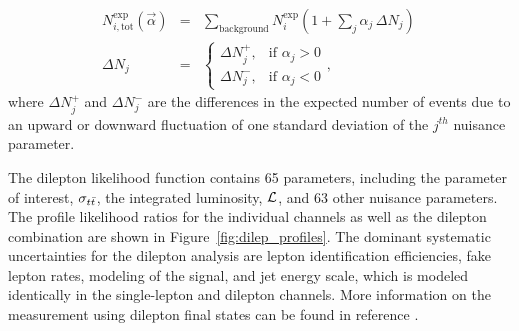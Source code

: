 \begin{eqnarray}\label{Eq:alphaInterpolation}
N^{\text{exp}}_{i, \text{tot}}(\vec{\alpha}) &=& \sum_{\text{background}} N^{\text{exp}}_{i} (1 + \sum_{j} \alpha_{j} \, \Delta N_j  ) \, \\ 
\Delta N_j &=& \begin{cases} \Delta N^{+}_{j}, & \mbox{if } \alpha_{j} > 0  \\ \Delta N^{-}_{j}, & \mbox{if } \alpha_{j} < 0 \end{cases} , 
\end{eqnarray} 
where $\Delta N^{+}_{j}$ and $\Delta N^{-}_{j}$ are the differences in the expected number of events due to an upward or downward fluctuation of one standard deviation of the $j^{th}$ nuisance parameter. 

The dilepton likelihood function contains 65 parameters, including the parameter of interest, $\sigma_{t\bar{t}}$, the integrated luminosity, ${\cal L}$, and 63 other nuisance parameters.
The profile likelihood ratios for the individual channels as well as the dilepton combination are shown in Figure~\ref{fig:dilep_profiles}.  
The dominant systematic uncertainties for the dilepton analysis are lepton identification efficiencies, fake lepton rates, modeling of the signal, and jet energy scale, which is modeled identically in the single-lepton and dilepton channels.
More information on the measurement using dilepton final states can be found in reference \cite{DILEPTON_PAPER}.

